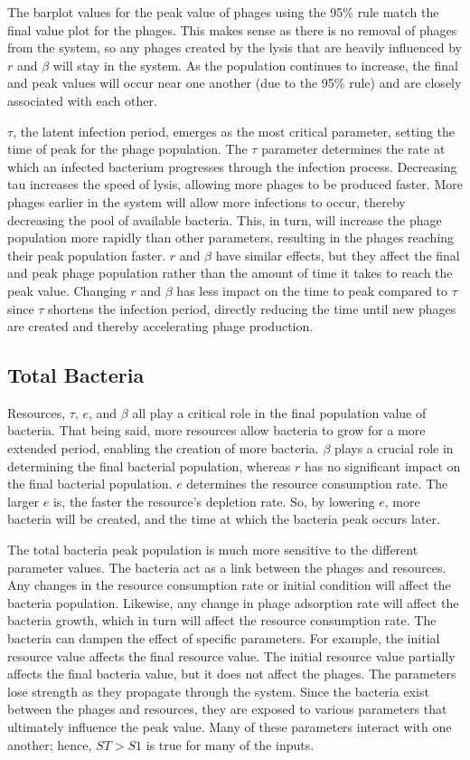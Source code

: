 The barplot values for the peak value of phages using the 95\% rule match the final value plot for the phages. 
This makes sense as there is no removal of phages from the system, so any phages created by the lysis that are heavily influenced by $r$ and $\beta$ will stay in the system. 
As the population continues to increase, the final and peak values will occur near one another (due to the 95\% rule) and are closely associated with each other.

$\tau$, the latent infection period, emerges as the most critical parameter, setting the time of peak for the phage population. 
The $\tau$ parameter determines the rate at which an infected bacterium progresses through the infection process. 
Decreasing tau increases the speed of lysis, allowing more phages to be produced faster. 
More phages earlier in the system will allow more infections to occur, thereby decreasing the pool of available bacteria. 
This, in turn, will increase the phage population more rapidly than other parameters, resulting in the phages reaching their peak population faster.
$r$ and $\beta$ have similar effects, but they affect the final and peak phage population rather than the amount of time it takes to reach the peak value. 
Changing $r$ and $\beta$ has less impact on the time to peak compared to $\tau$ since $\tau$ shortens the infection period, directly reducing the time until new phages are created and thereby accelerating phage production.

\subsection{Total Bacteria}
Resources, $\tau$, $e$, and $\beta$ all play a critical role in the final population value of bacteria. 
That being said, more resources allow bacteria to grow for a more extended period, enabling the creation of more bacteria. 
$\beta$ plays a crucial role in determining the final bacterial population, whereas $r$ has no significant impact on the final bacterial population. 
$e$ determines the resource consumption rate. 
The larger $e$ is, the faster the resource’s depletion rate. 
So, by lowering $e$, more bacteria will be created, and the time at which the bacteria peak occurs later. 

The total bacteria peak population is much more sensitive to the different parameter values. 
The bacteria act as a link between the phages and resources. 
Any changes in the resource consumption rate or initial condition will affect the bacteria population. 
Likewise, any change in phage adsorption rate will affect the bacteria growth, which in turn will affect the resource consumption rate. 
The bacteria can dampen the effect of specific parameters. 
For example, the initial resource value affects the final resource value. 
The initial resource value partially affects the final bacteria value, but it does not affect the phages. 
The parameters lose strength as they propagate through the system. 
Since the bacteria exist between the phages and resources, they are exposed to various parameters that ultimately influence the peak value. 
Many of these parameters interact with one another; hence, $ST > S1$ is true for many of the inputs. 

